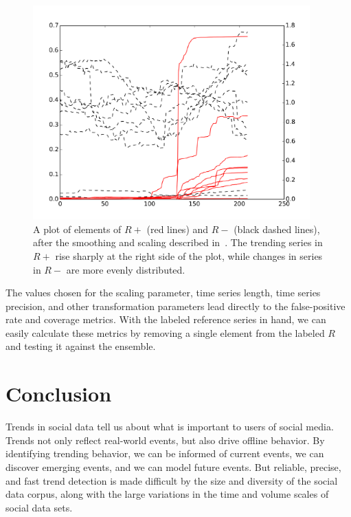 \documentclass{article}
\begin{document}
\begin{figure}
\begin{center}
\includegraphics[width=0.95\textwidth]{fig/nikolov3.pdf} 
\caption{A plot of elements of $R+$ (red lines) and $R-$ (black dashed lines), 
after the smoothing and scaling described in~\cite{Nikolov:2011}.  
The trending series in $R+$ rise sharply at the right side of the plot, 
while changes in series in $R-$ are more evenly distributed.}
\label{fig:reference_series}
\end{center}
\end{figure}

The values chosen for the scaling parameter, time series length, time series
precision, and other transformation parameters lead directly to the
false-positive rate and coverage metrics. With the labeled reference series
in hand, we can easily calculate these metrics by removing a single
element from the labeled $R$ and testing it against the ensemble. 


\section{Conclusion} 

Trends in social data tell us about what is important to users of social media.
Trends not only reflect real-world events, but also drive offline behavior. By
identifying trending behavior, we can be informed of current events, we can
discover emerging events, and we can model future events. But reliable,
precise, and fast trend detection is made difficult by the size and diversity
of the social data corpus, along with the large variations in the time and
volume scales of social data sets. 
\end{document}

